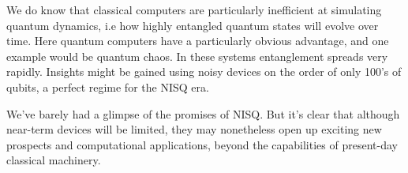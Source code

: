 We do know that classical computers are particularly inefficient at simulating quantum dynamics, i.e how highly entangled quantum states will evolve over time. Here quantum computers have a particularly obvious advantage, and one example would be quantum chaos. In these systems entanglement spreads very rapidly. Insights might be gained using noisy devices on the order of only 100's of qubits, a perfect regime for the NISQ era.

We've barely had a glimpse of the promises of NISQ. But it's clear that although near-term devices will be limited, they may nonetheless open up exciting new prospects and computational applications, beyond the capabilities of present-day classical machinery.